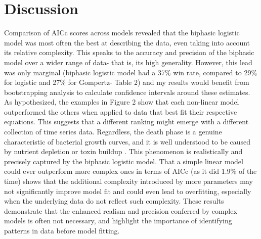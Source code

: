 \documentclass{article}
\begin{document}
\section{Discussion}
Comparison of AICc scores across models revealed that the biphasic logistic model was most often the best at describing the data, even taking into account its relative complexity. This speaks to the accuracy and precision of the biphasic model over a wider range of data- that is, its high generality. However, this lead was only marginal (biphasic logistic model had a 37\% win rate, compared to 29\% for logistic and 27\% for Gompertz- Table 2) and my results would benefit from bootstrapping analysis to calculate confidence intervals around these estimates. As hypothesized, the examples in Figure 2 show that each non-linear model outperformed the others when applied to data that best fit their respective equations. This suggests that a different ranking might emerge with a different collection of time series data. Regardless, the death phase is a genuine characteristic of bacterial growth curves, and it is well understood to be caused by nutrient depletion or toxin buildup \cite{micha2011}. This phenomenon is realistically and precisely captured by the biphasic logistic model. That a simple linear model could ever outperform more complex ones in terms of AICc (as it did 1.9\% of the time) shows that the additional complexity introduced by more parameters may not significantly improve model fit and could even lead to overfitting, especially when the underlying data do not reflect such complexity. These results demonstrate that the enhanced realism and precision conferred by complex models is often not necessary, and highlight the importance of identifying patterns in data before model fitting.
\end{document}
